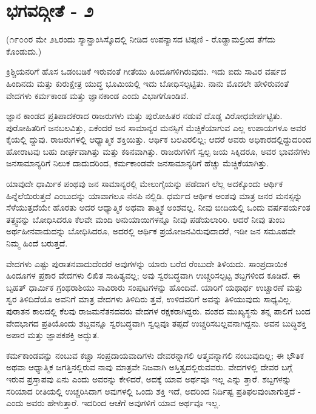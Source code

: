 
\chapter{ಭಗವದ್ಗೀತೆ - ೨}

(೧೯೦೦ರ ಮೇ ೨೬ರಂದು ಸ್ಯಾನ್ಫ್ರಾಂಸಿಸ್ಕೊದಲ್ಲಿ ನೀಡಿದ ಉಪನ್ಯಾಸದ ಟಿಪ್ಪಣಿ - ರೊಡ್ಹಾಮಲ್ರಿಂದ ತೆಗೆದು ಕೊಂಡುದು.)

ಕ್ರಿಶ್ಚಿಯನರಿಗೆ ಹೊಸ ಒಡಂಬಡಿಕೆ ಇರುವಂತೆ ಗೀತೆಯು ಹಿಂದೂಗಳಿಗಿರುವುದು. ಇದು ಐದು ಸಾವಿರ ವರ್ಷದ ಹಿಂದಿನದು ಮತ್ತು ಕುರುಕ್ಷೇತ್ರ ಯುದ್ಧ ಭೂಮಿಯಲ್ಲಿ ಇದು ಬೋಧಿಸಲ್ಪಟ್ಟಿತು. ನಾನು ಮೊದಲೇ ಹೇಳಿರುವಂತೆ ವೇದಗಳು ಕರ್ಮಕಾಂಡ ಮತ್ತು ಜ್ಞಾನಕಾಂಡ ಎಂದು ವಿಭಾಗಗೊಂಡಿವೆ.

ಜ್ಞಾನ ಕಾಂಡದ ಪ್ರತಿಪಾದಕರಾದ ರಾಜರುಗಳು ಮತ್ತು ಪುರೋಹಿತರ ನಡುವೆ ದೊಡ್ಡ ವಿರೋಧವೇರ್ಪಟ್ಟಿತು. ಪುರೋಹಿತರಿಗೆ ಜನಬಲವಿತ್ತು, ಏಕೆಂದರೆ ಜನ ಸಾಮಾನ್ಯರ ಮನಸ್ಸಿಗೆ ಮೆಚ್ಚಿಕೆಯಾಗುವ ಎಲ್ಲ ಉಪಾಯಗಳೂ ಅವರ ಕೈಯಲ್ಲಿ ದ್ದುವು. ರಾಜರುಗಳಲ್ಲಿ ಆಧ್ಯಾತ್ಮಿಕ ಶಕ್ತಿಯಿತ್ತು. ಆರ್ಥಿಕ ಬಲವಿರಲಿಲ್ಲ; ಆದರೆ ಅವರು ಅಧಿಕಾರದಲ್ಲಿದ್ದುದರಿಂದ ಹೋರಾಟವು ಬಹು ದೀರ್ಘವಾಗಿತ್ತು ಮತ್ತು ಕಠಿನವಾಗಿತ್ತು. ರಾಜರುಗಳಿಗೆ ಸ್ವಲ್ಪ ಜಯ ಸಿಕ್ಕಿದರೂ, ಅವರ ಭಾವನೆಗಳು ಜನಸಾಮಾನ್ಯರಿಗೆ ನಿಲುಕ ದಾದುದರಿಂದ, ಕರ್ಮಕಾಂಡವೇ ಜನಸಾಮಾನ್ಯರಿಗೆ ಹೆಚ್ಚು ಮೆಚ್ಚಿಕೆಯಾಗಿತ್ತು.

ಯಾವುದೇ ಧಾರ್ಮಿಕ ಪಂಥವು ಜನ ಸಾಮಾನ್ಯರಲ್ಲಿ ಮೇಲುಗೈಯನ್ನು ಪಡೆದಾಗ ಲೆಲ್ಲ ಅದಕ್ಕೊಂದು ಆರ್ಥಿಕ ಹಿನ್ನೆಲೆಯಿರುತ್ತದೆ ಎಂಬುದನ್ನು ಯಾವಾಗಲೂ ನೆನಪಿ ನಲ್ಲಿಡಿ. ಧರ್ಮದ ಆರ್ಥಿಕ ಅಂಶವು ಮಾತ್ರ ಜನರ ಮನಸ್ಸನ್ನು ಸೆಳೆಯುತ್ತದೆಯೇ ಹೊರತು ಅದರ ಆಧ್ಯಾತ್ಮಿಕ ಅಥವಾ ತಾತ್ತ್ವಿಕ ಅಂಶವಲ್ಲ. ನೀವು ಬೀದಿಯಲ್ಲಿ ಒಂದು ವರ್ಷಪರ್ಯಂತ ತತ್ತ್ವವನ್ನು ಬೋಧಿಸಿದರೂ ಕೆಲವೇ ಮಂದಿ ಅನುಯಾಯಿಗಳನ್ನೂ ನೀವು ಪಡೆಯಲಾರಿರಿ. ಆದರೆ ನೀವು ತುಂಬ ಅರ್ಥಹೀನವಾದುದನ್ನು ಬೋಧಿಸಿದರೂ, ಅದರಲ್ಲಿ ಆರ್ಥಿಕ ಪ್ರಯೋಜನವಿರುವುದಾದರೆ, ಇಡೀ ಜನ ಸಮೂಹವೇ ನಿಮ್ಮ ಹಿಂದೆ ಬರುತ್ತದೆ.

ವೇದಗಳು ಎಷ್ಟು ಪುರಾತನವಾದುದೆಂದರೆ ಅವುಗಳನ್ನು ಯಾರು ಬರೆದ ರೆಂಬುದೇ ತಿಳಿಯದು. ಸಾಂಪ್ರದಾಯಿಕ ಹಿಂದೂಗಳ ಪ್ರಕಾರ ವೇದಗಳು ಲಿಖಿತ ಸಾಹಿತ್ಯವಲ್ಲ; ಅವು ಸ್ವರಬದ್ಧವಾಗಿ ಉಚ್ಚರಿಸಲ್ಪಟ್ಟ ಶಬ್ದಗಳಿಂದ ಕೂಡಿದೆ. ಈ ಬೃಹತ್ ಧಾರ್ಮಿಕ ಗ್ರಂಥರಾಶಿಯು ಸಾವಿರಾರು ಸಂಪುಟಗಳನ್ನು ಹೊಂದಿವೆ. ಯಾರಿಗೆ ಯಥಾರ್ಥ ಉಚ್ಚಾರಣೆ ಮತ್ತು ಸ್ವರ ತಿಳಿದಿದೆಯೊ ಅವನಿಗೆ ಮಾತ್ರ ವೇದಗಳು ತಿಳಿದಿರು ತ್ತವೆ, ಉಳಿದವರಿಗೆ ಅವನ್ನು ತಿಳಿಯುವುದು ಸಾಧ್ಯವಿಲ್ಲ. ಪುರಾತನ ಕಾಲದಲ್ಲಿ ಕೆಲವು ರಾಜಮನೆತನದವರು ವೇದಗಳ ರಕ್ಷಕರಾಗಿದ್ದರು. ವಂಶದ ಮುಖ್ಯಸ್ಥನು ತನ್ನ ಪಾಲಿಗೆ ಬಂದ ವೇದಭಾಗದ ಪ್ರತಿಯೊಂದು ಶಬ್ದವನ್ನೂ ಸ್ವರಬದ್ಧವಾಗಿ ಸ್ವಲ್ಪವೂ ತಪ್ಪದೆ ಉಚ್ಚರಿಸಬಲ್ಲವನಾಗಿದ್ದನು. ಅವನ ಬುದ್ಧಿಶಕ್ತಿ ಅಪಾರ ಮತ್ತು ಜ್ಞಾಪಕಶಕ್ತಿ ಅದ್ಭುತ.

ಕರ್ಮಕಾಂಡವನ್ನು ನಂಬುವ ಕಚ್ಚಾ ಸಂಪ್ರದಾಯವಾದಿಗಳು ದೇವರನ್ನಾಗಲಿ ಆತ್ಮವನ್ನಾಗಲಿ ನಂಬುವುದಿಲ್ಲ; ಈ ಭೌತಿಕ ಅಥವಾ ಆಧ್ಯಾತ್ಮಿಕ ಜಗತ್ತಿನಲ್ಲಿರುವ ನಾವು ಮಾತ್ರವೇ ನಿಜವಾಗಿ ಅಸ್ತಿತ್ವದಲ್ಲಿರುವವರು. ವೇದಗಳಲ್ಲಿ ದೇವರ ಬಗ್ಗೆ ಇರುವ ಪ್ರಸ್ತಾಪವು ಏನು ಎಂದು ಅವರನ್ನು ಕೇಳಿದರೆ, ಅದಕ್ಕೆ ಯಾವ ಅರ್ಥವೂ ಇಲ್ಲ ಎನ್ನು ತ್ತಾರೆ. ಶಬ್ದಗಳನ್ನು ಸರಿಯಾದ ರೀತಿಯಲ್ಲಿ ಉಚ್ಚರಿಸಿದಾಗ ಅವುಗಳಲ್ಲಿ ಒಂದು ಶಕ್ತಿ ಇದೆ, ಅದರಿಂದ ನಿರ್ದಿಷ್ಟ ಪ್ರತಿಫಲವುಂಟಾಗುತ್ತದೆ - ಎಂದು ಅವರು ಹೇಳುತ್ತಾರೆ. ಇದರಿಂದ ಆಚೆಗೆ ಅವುಗಳಿಗೆ ಯಾವ ಅರ್ಥವೂ ಇಲ್ಲ.

